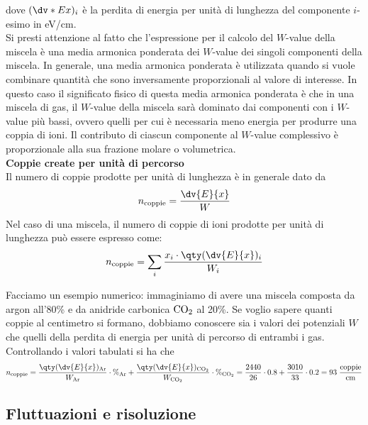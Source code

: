 \begin{approfondimento}
   dove $(\dv*{E}{x})_i$ è la perdita di energia per unità di lunghezza del componente $i$-esimo in eV/cm.\\
   Si presti attenzione al fatto che l'espressione per il calcolo del $W$-value della miscela è una media armonica ponderata dei $W$-value dei singoli componenti della miscela. In generale, una media armonica ponderata è utilizzata quando si vuole combinare quantità che sono inversamente proporzionali al valore di interesse. In questo caso il significato fisico di questa media armonica ponderata è che in una miscela di gas, il $W$-value della miscela sarà dominato dai componenti con i $W$-value più bassi, ovvero quelli per cui è necessaria meno energia per produrre una coppia di ioni. Il contributo di ciascun componente al $W$-value complessivo è proporzionale alla sua frazione molare o volumetrica.\\[0.2cm]
   \textbf{Coppie create per unità di percorso}\\
   Il numero di coppie prodotte per unità di lunghezza è in generale dato da
   \begin{equation*}
      n_{\rm coppie}=\frac{\dv{E}{x}}{W}
   \end{equation*}
   Nel caso di una miscela, il numero di coppie di ioni prodotte per unità di lunghezza può essere espresso come:
   \begin{equation*}
      n_{\rm coppie}
      =\sum_i \frac{x_i \cdot \qty( \dv{E}{x} )_i}{W_i}
   \end{equation*}
\end{approfondimento}

Facciamo un esempio numerico: immaginiamo di avere una miscela composta da argon all'80\% e da anidride carbonica $\rm CO_2$ al 20\%. Se voglio sapere quanti coppie al centimetro si formano, dobbiamo conoscere sia i valori dei potenziali $W$ che quelli della perdita di energia per unità di percorso di entrambi i gas. Controllando i valori tabulati si ha che
\begin{equation*}
   n_{\rm coppie}
   =\frac{\qty(\dv{E}{x})_{\rm Ar}}{W_{\rm Ar}} \cdot \%_{\rm Ar} + \frac{\qty(\dv{E}{x})_{\rm CO_2}}{W_{\rm CO_2}} \cdot \%_{\rm CO_2}
   =\frac{2440}{26} \cdot 0.8 + \frac{3010}{33} \cdot 0.2
   =93 \; \rm \frac{coppie}{cm}
\end{equation*}
\subsection{Fluttuazioni e risoluzione}

